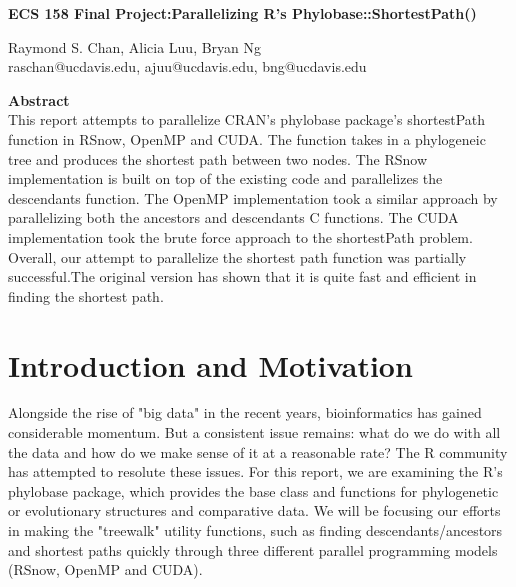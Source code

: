 \documentclass[11pt,letterpaper]{article}
\begin{document}
\begin{center}
{\huge \textbf{ECS 158 Final Project:Parallelizing R's Phylobase::ShortestPath()}\\
\vspace{5mm}
\begin{Large}
Raymond S. Chan, Alicia Luu, Bryan Ng\\
raschan@ucdavis.edu, ajuu@ucdavis.edu, bng@ucdavis.edu\\
\end{Large}}
\end{center}


\vspace{5mm}

\begin{center}
	\begin{large}
		\textbf{Abstract}\\
This report attempts to parallelize CRAN's phylobase package's shortestPath function in RSnow, OpenMP and CUDA. The function takes in a phylogeneic tree and produces the shortest path between two nodes. The RSnow implementation is built on top of the existing code and parallelizes the descendants function. The OpenMP implementation took a similar approach by parallelizing both the ancestors and descendants C functions. The CUDA implementation took the brute force approach to the shortestPath problem. Overall, our attempt to parallelize the shortest path function was partially successful.The original version has shown that it is quite fast and efficient in finding the shortest path. \\
	\end{large}
\end{center}

\section{Introduction and Motivation}
 
Alongside the rise of "big data" in the recent years, bioinformatics has gained considerable momentum. But a consistent issue remains: what do we do with all the data and how do we make sense of it at a reasonable rate? The R community has attempted to resolute these issues. For this report, we are examining the R's phylobase package, which provides the base class and functions for phylogenetic or evolutionary structures and comparative data. We will be focusing our efforts in making the "treewalk" utility functions, such as finding descendants/ancestors and shortest paths quickly through three different parallel programming models (RSnow, OpenMP and CUDA).  
\end{document}
